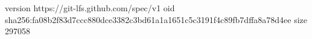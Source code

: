 version https://git-lfs.github.com/spec/v1
oid sha256:fa08b2f83d7ccc880dce3382c3bd61a1a1651c5c3191f4c89fb7dffa8a78d4ee
size 297058
